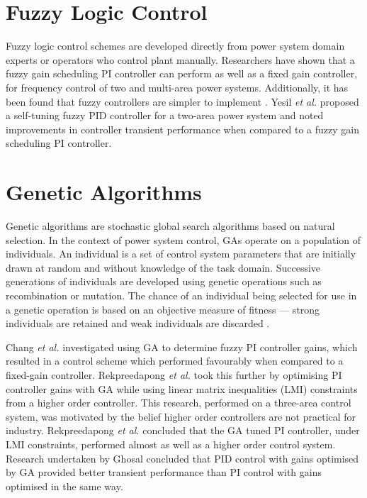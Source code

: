 \section{Fuzzy Logic Control}
Fuzzy logic control schemes are developed directly from power system domain experts or operators who control plant manually. Researchers have shown that a fuzzy gain scheduling PI controller can perform as well as a fixed gain controller, for frequency control of two and multi-area power systems. Additionally, it has been found that fuzzy controllers are simpler to implement \cite{Chang1997, Cam2005}. Yesil \textit{et al.} \cite{Yesil2004} proposed a self-tuning fuzzy PID controller for a two-area power system and noted improvements in controller transient performance when compared to a fuzzy gain scheduling PI controller.

\section{Genetic Algorithms}
Genetic algorithms are stochastic global search algorithms based on natural selection. In the context of power system control, GAs operate on a population of individuals. An individual is a set of control system parameters that are initially drawn at random and without knowledge of the task domain. Successive generations of individuals are developed using genetic operations such as recombination or mutation. The chance of an individual being selected for use in a genetic operation is based on an objective measure of fitness --- strong individuals are retained and weak individuals are discarded \cite{Fleming1993}.

Chang \textit{et al.} \cite{Chang1998} investigated using GA to determine fuzzy PI controller gains, which resulted in a control scheme which performed favourably when compared to a fixed-gain controller. Rekpreedapong \textit{et al.} \cite{Rerkpreedapong2003} took this further by optimising PI controller gains with GA while using linear matrix inequalities (LMI) constraints from a higher order controller. This research, performed on a three-area control system, was motivated by the belief higher order controllers are not practical for industry. Rekpreedapong \textit{et al.} concluded that the GA tuned PI controller, under LMI constraints, performed almost as well as a higher order control system. Research undertaken by Ghosal \cite{Ghoshal2004} concluded that PID control with gains optimised by GA provided better transient performance than PI control with gains optimised in the same way.

